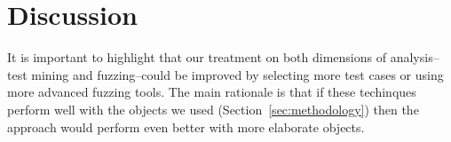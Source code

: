 \documentclass[10pt,conference,anonymous]{IEEEtran}
\begin{document}
% 

\section{Discussion}

It is important to highlight that our treatment on both dimensions of
analysis--test mining and fuzzing--could be improved by selecting more
test cases or using more advanced fuzzing tools. The main rationale is
that if these techinques perform well with the objects we used
(Section~\ref{sec:methodology}) then the approach would perform even
better with more elaborate objects.
\end{document}
